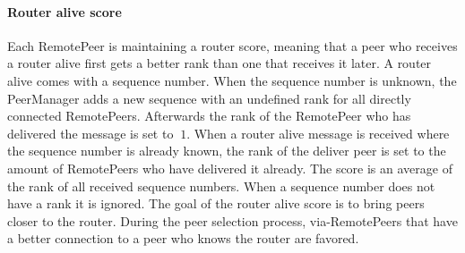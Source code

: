 \paragraph{Router alive score}
Each RemotePeer is maintaining a router score, meaning that a peer who receives a router alive first gets a better rank than one that receives it later. A router alive comes with a sequence number. When the sequence number is unknown, the PeerManager adds a new sequence with an undefined rank for all directly connected RemotePeers. Afterwards the rank of the RemotePeer who has delivered the message is set to $\ 1 $.
When a router alive message is received where the sequence number is already known, the rank of the deliver peer is set to the amount of RemotePeers who have delivered it already.
The score is an average of the rank of all received sequence numbers. When a sequence number does not have a rank it is ignored.
The goal of the router alive score is to bring peers closer to the router. During the peer selection process, via-RemotePeers that have a better connection to a peer who knows the router are favored.